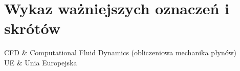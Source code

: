 \chapter*{Wykaz ważniejszych oznaczeń i skrótów}

\begin{symbols}
    CFD    & Computational Fluid Dynamics (obliczeniowa mechanika płynów) \\
    UE     & Unia Europejska \\
\end{symbols}
